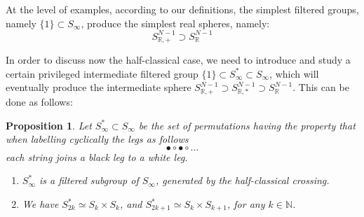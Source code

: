 \documentclass[12pt]{amsbook}
\newtheorem{proposition}[theorem]{Proposition}
\begin{document}
At the level of examples, according to our definitions, the simplest filtered groups, namely $\{1\}\subset S_\infty$, produce the simplest real spheres, namely:
$$S^{N-1}_{\mathbb R,+}\supset S^{N-1}_\mathbb R$$

In order to discuss now the half-classical case, we need to introduce and study a certain privileged intermediate filtered group $\{1\}\subset S_\infty^*\subset S_\infty$, which will eventually produce the intermediate sphere $S^{N-1}_{\mathbb R,+}\supset S^{N-1}_{\mathbb R,*}\supset S^{N-1}_\mathbb R$. This can be done as follows:

\begin{proposition}
Let $S_\infty^*\subset S_\infty$ be the set of permutations having the property that when labelling cyclically the legs as follows
$$\bullet\circ\bullet\circ\ldots$$
each string joins a black leg to a white leg.
\begin{enumerate}
\item $S_\infty^*$ is a filtered subgroup of $S_\infty$, generated by the half-classical crossing.

\item We have $S_{2k}^*\simeq S_k\times S_k$, and $S^*_{2k+1}\simeq S_k\times S_{k+1}$, for any $k\in\mathbb N$.
\end{enumerate}
\end{proposition}
\end{document}
